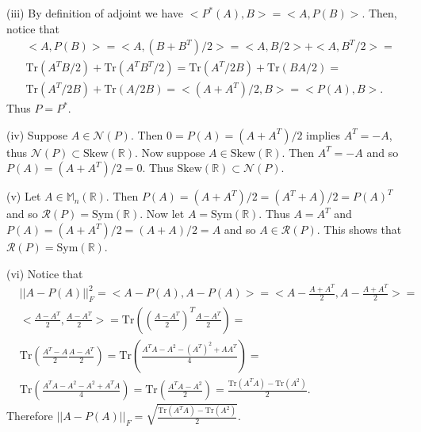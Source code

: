 \documentclass[11.5pt, letterpaper, bibtotoc,
    tablecaptionabove, figurecaptionabove]{article}
\begin{document}
(iii)
By definition of adjoint we have $<P^*(A),B>=<A,P(B)>$.
Then, notice that
\begin{align*}
    &<A,P(B)>=<A,(B+B^T)/2>=
    <A,B/2>+<A,B^T/2>=\\
    &\text{Tr}(A^TB/2)+\text{Tr}(A^TB^T/2)=
    \text{Tr}(A^T/2B)+\text{Tr}(BA/2)=\\
    &\text{Tr}(A^T/2B)+\text{Tr}(A/2B)=
    <(A+A^T)/2,B>=<P(A),B>.
\end{align*}
Thus $P=P^*$.

(iv)
Suppose $A\in\mathcal N(P)$. 
Then $0=P(A)=(A+A^T)/2$ implies $A^T=-A$, thus $\mathcal N(P)\subset\text{Skew}(\mathbb R)$.
Now suppose $A\in\text{Skew}(\mathbb R)$.
Then $A^T=-A$ and so $P(A)=(A+A^T)/2=0$. Thus $\text{Skew}(\mathbb R)\subset\mathcal N(P)$.

(v)
Let $A\in\mathbb M_n(\mathbb R)$.
Then $P(A)=(A+A^T)/2=(A^T+A)/2=P(A)^T$ and so $\mathcal R(P)=\text{Sym}(\mathbb R)$.
Now let $A=\text{Sym}(\mathbb R)$.
Thus $A=A^T$ and $P(A)=(A+A^T)/2=(A+A)/2=A$ and so $A\in\mathcal R(P)$.
This shows that $\mathcal R(P)=\text{Sym}(\mathbb R)$.

(vi)
Notice that
\begin{align*}
    &||A - P(A)||_F^2 = <A - P(A), A - P(A)> =
    <A - \frac{A + A^T}{2}, A - \frac{A + A^T}{2}> =\\
    &<\frac{A - A^T}{2}, \frac{A - A^T}{2}> = 
    \text{Tr}\left(\left(\frac{A - A^T}{2}\right)^T\frac{A - A^T}{2}\right)=\\
    &\text{Tr}\left(\frac{A^T - A}{2}\frac{A - A^T}{2}\right) = 
    \text{Tr}\left(\frac{A^TA - A^2 - (A^T)^2 + AA^T}{4}\right) =\\ 
    &\text{Tr}\left(\frac{A^TA - A^2 - A^2 + A^TA}{4}\right) =
    \text{Tr}\left(\frac{A^TA - A^2}{2}\right) = 
    \frac{\text{Tr}(A^TA) - \text{Tr}(A^2)}{2}.
\end{align*}
Therefore $||A - P(A)||_F = \sqrt{\frac{\text{Tr}(A^TA) - \text{Tr}(A^2)}{2}}$.
\end{document}

